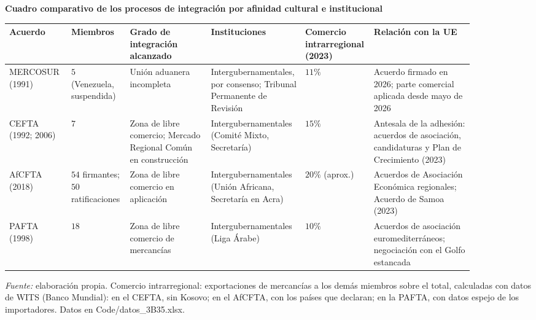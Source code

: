 \documentclass[10pt,a4paper]{article}
\begin{document}
\begin{center}
\textbf{Cuadro comparativo de los procesos de integración por afinidad cultural e institucional}\par\medskip
{\footnotesize\renewcommand{\arraystretch}{1.3}
\begin{tabular}{|p{0.13\linewidth}|p{0.11\linewidth}|p{0.17\linewidth}|p{0.17\linewidth}|p{0.09\linewidth}|p{0.21\linewidth}|}
\hline
\raggedright\textbf{Acuerdo} & \raggedright\textbf{Miembros} & \raggedright\textbf{Grado de integración alcanzado} & \raggedright\textbf{Instituciones} & \raggedright\textbf{Comercio intrarre\-gional (2023)} & \raggedright\textbf{Relación con la UE}\tabularnewline
\hline
\raggedright MERCOSUR (1991) & \raggedright $5$ (Venezuela, suspendida) & \raggedright Unión aduanera incompleta & \raggedright Intergubernamentales, por consenso; Tribunal Permanente de Revisión & \raggedright $11\%$ & \raggedright Acuerdo firmado en 2026; parte comercial aplicada desde mayo de 2026\tabularnewline
\hline
\raggedright CEFTA (1992; 2006) & \raggedright $7$ & \raggedright Zona de libre comercio; Mercado Regional Común en construcción & \raggedright Intergubernamentales (Comité Mixto, Secretaría) & \raggedright $15\%$ & \raggedright Antesala de la adhesión: acuerdos de asociación, candidaturas y Plan de Crecimiento (2023)\tabularnewline
\hline
\raggedright AfCFTA (2018) & \raggedright $54$ firmantes; $50$ ratificaciones & \raggedright Zona de libre comercio en aplicación & \raggedright Intergubernamentales (Unión Africana, Secretaría en Acra) & \raggedright $20\%$ (aprox.) & \raggedright Acuerdos de Asociación Económica regionales; Acuerdo de Samoa (2023)\tabularnewline
\hline
\raggedright PAFTA (1998) & \raggedright $18$ & \raggedright Zona de libre comercio de mercancías & \raggedright Intergubernamentales (Liga Árabe) & \raggedright $10\%$ & \raggedright Acuerdos de asociación euromediterráneos; negociación con el Golfo estancada\tabularnewline
\hline
\end{tabular}}\par\smallskip
{\footnotesize\textit{Fuente:} elaboración propia. Comercio intrarregional: exportaciones de mercancías a los demás miembros sobre el total, calculadas con datos de WITS (Banco Mundial): en el CEFTA, sin Kosovo; en el AfCFTA, con los países que declaran; en la PAFTA, con datos espejo de los importadores. Datos en Code/datos\_3B35.xlsx.}
\end{center}
\end{document}
